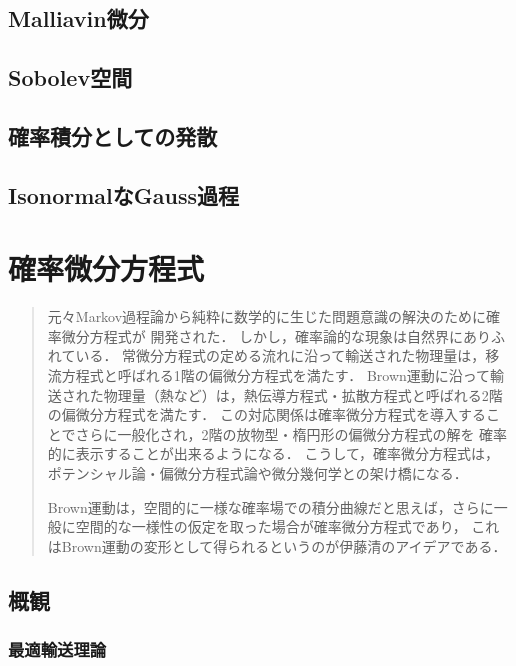 \documentclass[uplatex,dvipdfmx]{jsreport}
\begin{document}
\section{Malliavin微分}

\section{Sobolev空間}

\section{確率積分としての発散}

\section{IsonormalなGauss過程}

\chapter{確率微分方程式}

\begin{quotation}
    元々Markov過程論から純粋に数学的に生じた問題意識の解決のために確率微分方程式が
    開発された．
    しかし，確率論的な現象は自然界にありふれている．
    常微分方程式の定める流れに沿って輸送された物理量は，移流方程式と呼ばれる1階の偏微分方程式を満たす．
    Brown運動に沿って輸送された物理量（熱など）は，熱伝導方程式・拡散方程式と呼ばれる2階の偏微分方程式を満たす．
    この対応関係は確率微分方程式を導入することでさらに一般化され，2階の放物型・楕円形の偏微分方程式の解を
    確率的に表示することが出来るようになる．
    こうして，確率微分方程式は，ポテンシャル論・偏微分方程式論や微分幾何学との架け橋になる．

    Brown運動は，空間的に一様な確率場での積分曲線だと思えば，さらに一般に空間的な一様性の仮定を取った場合が確率微分方程式であり，
    これはBrown運動の変形として得られるというのが伊藤清のアイデアである．
\end{quotation}

\section{概観}

\subsection{最適輸送理論}

\begin{definition}
    
\end{definition}
\end{document}
